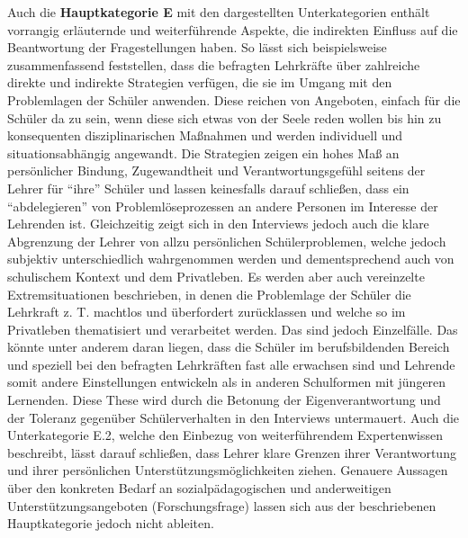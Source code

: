 \noindent
Auch die \textbf{Hauptkategorie E} mit den dargestellten Unterkategorien enthält vorrangig erläuternde und weiterführende Aspekte, die indirekten Einfluss auf die Beantwortung der Fragestellungen haben. So lässt sich beispielsweise zusammenfassend feststellen, dass die befragten Lehrkräfte über zahlreiche direkte und indirekte Strategien verfügen, die sie im Umgang mit den Problemlagen der Schüler anwenden. Diese reichen von Angeboten, einfach für die Schüler da zu sein, wenn diese sich etwas von der Seele reden wollen bis hin zu konsequenten disziplinarischen Maßnahmen und werden individuell und situationsabhängig angewandt. Die Strategien zeigen ein hohes Maß an persönlicher Bindung, Zugewandtheit und Verantwortungsgefühl seitens der Lehrer für "`ihre"' Schüler und lassen keinesfalls darauf schließen, dass ein "`abdelegieren"' von Problemlöseprozessen an andere Personen im Interesse der Lehrenden ist. Gleichzeitig zeigt sich in den Interviews jedoch auch die klare Abgrenzung der Lehrer von allzu persönlichen Schülerproblemen, welche jedoch subjektiv unterschiedlich wahrgenommen werden und dementsprechend  auch von schulischem Kontext und dem Privatleben. Es werden aber auch vereinzelte Extremsituationen beschrieben, in denen die Problemlage der Schüler die Lehrkraft z. T. machtlos und überfordert zurücklassen und welche so im Privatleben thematisiert und verarbeitet werden. Das sind jedoch Einzelfälle. Das könnte unter anderem daran liegen, dass die Schüler im berufsbildenden Bereich und speziell bei den befragten Lehrkräften fast alle erwachsen sind und Lehrende somit andere Einstellungen entwickeln als in anderen Schulformen mit jüngeren Lernenden. Diese These wird durch die Betonung der Eigenverantwortung und der Toleranz gegenüber Schülerverhalten in den Interviews  untermauert. Auch die Unterkategorie E.2, welche den Einbezug von weiterführendem Expertenwissen beschreibt, lässt darauf schließen, dass Lehrer klare Grenzen ihrer Verantwortung und ihrer persönlichen Unterstützungsmöglichkeiten ziehen. Genauere Aussagen über den konkreten Bedarf an sozialpädagogischen und anderweitigen Unterstützungsangeboten (Forschungsfrage) lassen sich aus der beschriebenen Hauptkategorie jedoch nicht ableiten.\\


